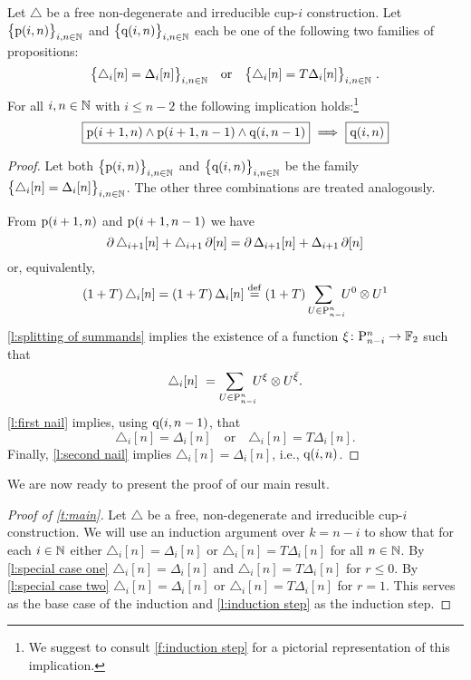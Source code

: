 \begin{lemma} \label{l:induction step}
	Let $\triangle$ be a free non-degenerate and irreducible cup-$i$ construction.
	Let $\big\{ \mathrm{p}(i,n) \big\}_{i,n \in \mathbb{N}}$ and $\big\{ \mathrm{q}(i,n) \big\}_{i,n \in \mathbb{N}}$ each be one of the following two families of propositions:
	\[
	\big\{ \triangle_i [n] = \Delta_ i [n] \big\}_{i,n\in\N}
	\quad \text{or} \quad
	\big\{ \triangle_i [n] = T \Delta_ i [n] \big\}_{i,n\in\N} \ .
	\]
	For all $i,n \in \mathbb{N}$ with $i \leq n-2$ the following implication holds:\footnote{We suggest to consult \cref{f:induction step} for a pictorial representation of this implication.}
	\[
	\boxed{\mathrm{p}(i+1,n) \wedge \mathrm{p}(i+1,n-1) \wedge \mathrm{q}(i,n-1)}\ \Longrightarrow\ \boxed{\mathrm{q}(i,n)}
	\]
\end{lemma}

\begin{proof}
	Let both $\big\{ \mathrm{p}(i,n) \big\}_{i,n\in\mathbb{N}}$ and $\big\{ \mathrm{q}(i,n) \big\}_{i,n\in\mathbb{N}}$ be the family $\big\{ \triangle_i [n] = \Delta_i [n] \big\}_{i,n \in \mathbb{N}}$.
	The other three combinations are treated analogously.

	From $\mathrm{p}(i+1,n)$ and $\mathrm{p}(i+1,n-1)$ we have
	\[
	\operatorname{\partial} \triangle_{i+1} [n] + \triangle_{i+1} \operatorname{\partial} [n] = \operatorname{\partial} \Delta_{i+1} [n] + \Delta_{i+1} \operatorname{\partial} [n]
	\]
	or, equivalently,
	\begin{align*}
	(1+T) \, \triangle_i [n] =
	(1+T) \, \Delta_i [n] \stackrel{\mathrm{def}}{=}
	(1+T) \sum_{U \in \mathrm{P}_{n-i}^n \kern-5pt} {U^0} \otimes {U^1}
	\end{align*}
	\cref{l:splitting of summands} implies the existence of a function $\xi \colon \mathrm{P}_{n-i}^n \to {\mathbb{F}_2}$ such that
	\[
	\triangle_i [n] \ =
	\sum_{U \in \mathrm{P}_{n-i}^n \kern-5pt} U^\xi \otimes U^{\bar{\xi}}.
	\]
	\cref{l:first nail} implies, using $\mathrm{q}(i,n-1)$, that
	\[
	\triangle_i [n] = \Delta_i [n]
	\quad \text{or} \quad
	\triangle_i [n] = T \Delta_i [n].
	\]
	Finally, \cref{l:second nail} implies $\triangle_i [n] = \Delta_i [n]$, i.e., $\mathrm{q}(i,n)$.
\end{proof}

We are now ready to present the proof of our main result.

\begin{proof}[Proof of \cref{t:main}]
	Let $\triangle$ be a free, non-degenerate and irreducible cup-$i$ construction.
	We will use an induction argument over $k = n-i$ to show that for each $i \in \mathbb{N}$ either $\triangle_i [n] = \Delta_i [n]$ or
	$\triangle_i [n] = T \Delta_i [n]$ for all $n \in \mathbb{N}$.
	By \cref{l:special case one} $\triangle_i [n] = \Delta_i [n]$ and $\triangle_i [n] = T \Delta_i [n]$ for $r \leq 0$.
	By \cref{l:special case two} $\triangle_i [n] = \Delta_i [n]$ or $\triangle_i [n] = T \Delta_i [n]$ for $r = 1$.
	This serves as the base case of the induction and \cref{l:induction step} as the induction step.
\end{proof}